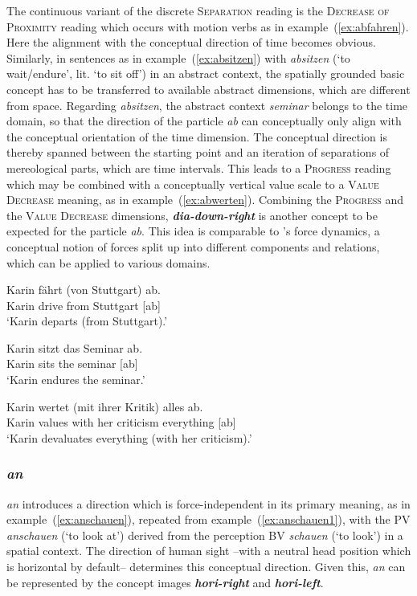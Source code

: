 \documentclass[output=paper]{langsci/langscibook}
\newcommand{\textci}[1]{\textit{\textbf{#1}}}
\begin{document}
The continuous variant of the discrete \textsc{Separation} reading is
the \textsc{Decrease of Proximity} reading which occurs with motion
verbs as in example~(\ref{ex:abfahren}). Here the alignment with the
conceptual direction of time becomes obvious. Similarly, in sentences
as in example~(\ref{ex:absitzen}) with \textit{absitzen} (`to
wait/endure', lit. `to sit off') in an abstract context, the spatially
grounded basic concept has to be transferred to available abstract
dimensions, which are different from space. Regarding
\textit{absitzen}, the abstract context \textit{seminar} belongs to
the time domain, so that the direction of the particle \textit{ab} can
conceptually only align with the conceptual orientation of the time
dimension. The conceptual direction is thereby spanned between the
starting point and an iteration of separations of mereological parts,
which are time intervals. This leads to a \textsc{Progress} reading
which may be combined with a conceptually vertical value scale
\citep{Tversky:11} to a \textsc{Value Decrease} meaning, as in
example~(\ref{ex:abwerten}). Combining the \textsc{Progress} and the
\textsc{Value Decrease} dimensions, \textci{dia-down-right} is another
concept to be expected for the particle \textit{ab}. This idea is
comparable to \cite{Talmy:00}'s force dynamics, a conceptual notion of
forces split up into different components and relations, which can be
applied to various domains.

\ea\label{ex:abfahren}
\gll Karin fährt (von Stuttgart) ab.\\
Karin drive from Stuttgart [ab]\\
\glt `Karin departs (from Stuttgart).'
\z
  
\ea\label{ex:absitzen}
\gll Karin sitzt das Seminar ab.\\
Karin sits the seminar [ab]\\
\glt `Karin endures the seminar.'
\z
  
\ea\label{ex:abwerten}
\gll Karin wertet (mit ihrer Kritik) alles ab.\\
Karin values with her criticism everything [ab]\\
\glt `Karin devaluates everything (with her criticism).'
\z

\vspace{+1mm}
\subsubsection{\textit{an}}

\textit{an} introduces a direction which is force-independent in its
primary meaning, as in example~(\ref{ex:anschauen}), repeated from
example~(\ref{ex:anschauen1}), with the PV \textit{anschauen} (`to
look at') derived from the perception BV \textit{schauen} (`to look')
in a spatial context. The direction of human sight --with a neutral
head position which is horizontal by default-- determines this
conceptual direction. Given this, \textit{an} can be represented by
the concept images \textci{hori-right} and \textci{hori-left}.
\end{document}

